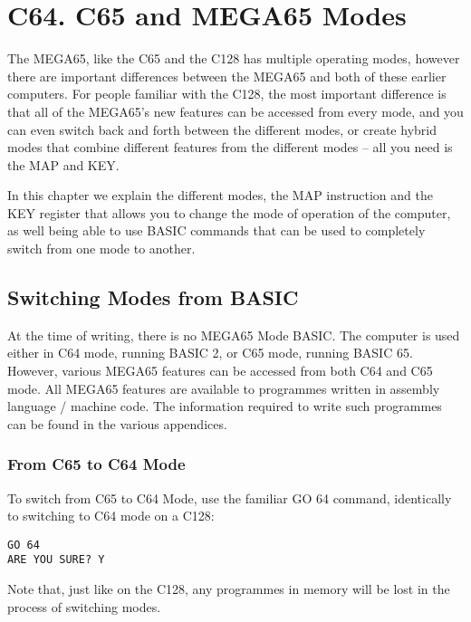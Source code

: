 \chapter {C64. C65 and MEGA65 Modes}
\label{cha:modes}

The MEGA65, like the C65 and the C128 has multiple operating modes,
however there are important differences between the MEGA65 and both
of these earlier computers.  For people familiar with the C128,
the most important difference is that all of the MEGA65's new features
can be accessed from every mode, and you can even switch back and forth
between the different modes, or create hybrid modes that combine different
features from the different modes -- all you need is the MAP and KEY.

In this chapter we explain the different modes, the MAP instruction and
the KEY register that allows you to change the mode of operation of the computer,
as well being able to use BASIC commands that can be used to completely switch
from one mode to another.

\section{Switching Modes from BASIC}

At the time of writing, there is no MEGA65 Mode BASIC. The computer is used either
in C64 mode, running BASIC 2, or C65 mode, running BASIC 65.  However, various MEGA65
features can be accessed from both C64 and C65 mode.  All MEGA65 features are available
to programmes written in assembly language / machine code.  The information required
to write such programmes can be found in the various appendices.

\subsection{From C65 to C64 Mode}

To switch from C65 to C64 Mode, use the familiar GO 64 command, identically to switching to C64
mode on a C128:

\begin{tcolorbox}[colback=black,coltext=white]
\verbatimfont{\codefont}
\begin{verbatim}
GO 64
ARE YOU SURE? Y
\end{verbatim}
\end{tcolorbox}

Note that, just like on the C128, any programmes in memory will be lost in the process of switching modes.

